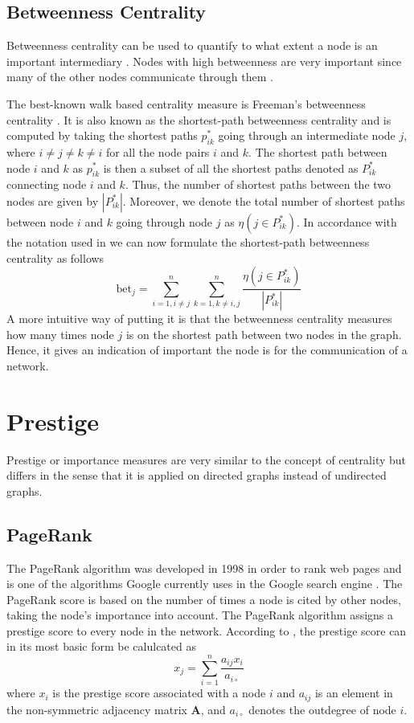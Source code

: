 \subsection{Betweenness Centrality}
Betweenness centrality can be used to quantify to what extent a node is an important intermediary \citep{fouss2016algorithms}. Nodes with high betweenness are very important since many of the other nodes communicate through them \citep{Kajdanowicz2013}. 

The best-known walk based centrality measure is Freeman's betweenness centrality \citep{fouss2016algorithms}. It is also known as the shortest-path betweenness centrality and is computed by taking the shortest paths $p_{ik}^*$ going through an intermediate node $j$, where $i\neq j \neq k\neq i$ for all the node pairs $i$ and $k$. The shortest path between node $i$ and $k$ as $p_{ik}^*$ is then a subset of all the shortest paths denoted as $P_{ik}^*$ connecting node $i$ and $k$. Thus, the number of shortest paths between the two nodes are given by $|P_{ik}^*|$. Moreover, we denote the total number of shortest paths between node $i$ and $k$ going through node $j$ as $\eta(j \in P_{ik}^*)$. In accordance with the notation used in \citep{fouss2016algorithms} we can now formulate the shortest-path betweenness centrality as follows
\begin{equation}
    \text{bet}_j=\sum_{i=1, i\neq j}^{n} \sum_{k=1, k \neq i,j}^{n} \frac{\eta(j \in P_{ik}^*)}{|P_{ik}^*|}
\end{equation}
A more intuitive way of putting it is that the betweenness centrality measures how many times node $j$ is on the shortest path between two nodes in the graph. Hence, it gives an indication of important the node is for the communication of a network. 

\section{Prestige}
Prestige or importance measures are very similar to the concept of centrality but differs in the sense that it is applied on directed graphs instead of undirected graphs. 

\subsection{PageRank}
The PageRank algorithm was developed in 1998 in order to rank web pages and is one of the algorithms Google currently uses in the Google search engine \cite{langville2004deeperinside,langville2012}. The PageRank score is based on the number of times a node is cited by other nodes, taking the node's importance into account. The PageRank algorithm assigns a prestige score to every node in the network. According to \citet{fouss2016algorithms}, the prestige score can in its most basic form be calulcated as 
\begin{equation}
    x_j=\sum_{i=1}^{n} \frac{a_{ij}x_i}{a_{i\circ}}
\end{equation}
where $x_i$ is the prestige score associated with a node $i$ and $a_{ij}$ is an element in the non-symmetric adjacency matrix $\textbf{A}$, and $a_{i\circ}$ denotes the outdegree of node $i$. 

